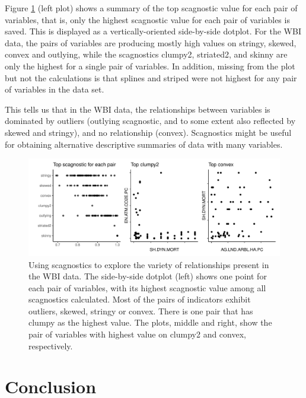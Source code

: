 Figure \ref{fig:wbistatic} (left plot) shows a summary of the top
scagnostic value for each pair of variables, that is, only the highest
scagnostic value for each pair of variables is saved. This is displayed
as a vertically-oriented side-by-side dotplot. For the WBI data, the
pairs of variables are producing mostly high values on stringy, skewed,
convex and outlying, while the scagnostics clumpy2, striated2, and
skinny are only the highest for a single pair of variables. In addition,
missing from the plot but not the calculations is that splines and
striped were not highest for any pair of variables in the data set.

This tells us that in the WBI data, the relationships between variables
is dominated by outliers (outlying scagnostic, and to some extent also
reflected by skewed and stringy), and no relationship (convex).
Scagnostics might be useful for obtaining alternative descriptive
summaries of data with many variables.

\begin{Schunk}
\begin{figure}
\includegraphics[width=1\linewidth]{mason-lee-laa-cook_files/figure-latex/wbistatic-1} \caption[Using scagnostics to explore the variety of relationships present in the WBI data]{Using scagnostics to explore the variety of relationships present in the WBI data. The side-by-side dotplot (left) shows one point for each pair of variables, with its highest scagnostic value among all scagnostics calculated. Most of the pairs of indicators exhibit outliers, skewed, stringy or convex. There is one pair that has clumpy as the highest value. The plots, middle and right, show the pair of variables with highest value on clumpy2 and convex, respectively.}\label{fig:wbistatic}
\end{figure}
\end{Schunk}

\hypertarget{conclusion}{%
\section{Conclusion}\label{conclusion}}


